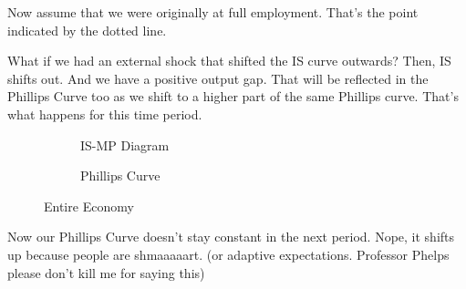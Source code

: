 \documentclass[11pt]{scrartcl}
\newcommand{\og}{\ensuremath{\tilde{Y}}}
\begin{document}
Now assume that we were originally at full employment. That's the point indicated by the dotted line.

What if we had an external shock that shifted the IS curve outwards? Then, IS shifts out. And we have a positive output gap. That will be reflected in the Phillips Curve too as we shift to a higher part of the same Phillips curve. That's what happens for this time period.

\begin{figure}[H]
\begin{subfigure}[b]{0.5\textwidth}
\centering
{}
\caption{\color{blue}IS-\color{black}MP Diagram}
\end{subfigure}
\hspace{2ex}
\begin{subfigure}[b]{0.5\textwidth}
\centering
{}
\caption{Phillips Curve}
\end{subfigure}
\caption{Entire Economy}
\end{figure}

Now our Phillips Curve doesn't stay constant in the next period. Nope, it shifts up because people are shmaaaaart. (or adaptive expectations. Professor Phelps please don't kill me for saying this)
\end{document}
